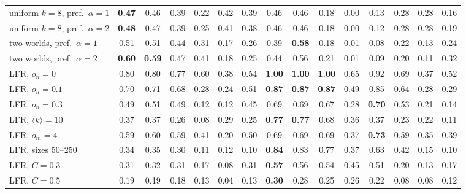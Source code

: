 \begin{table}[t]
\begin{ruledtabular}
\begin{tabular}{lcccccccccccccc}
\hline
uniform $k{=}8$, pref.\ $\alpha{=}1$ & \textbf{0.47} & 0.46 & 0.39 & 0.22 & 0.42 & 0.39 & 0.46 & 0.46 & 0.18 & 0.00 & 0.13 & 0.28 & 0.28 & 0.16 \\
uniform $k{=}8$, pref.\ $\alpha{=}2$ & \textbf{0.48} & 0.47 & 0.39 & 0.25 & 0.41 & 0.38 & 0.46 & 0.46 & 0.18 & 0.00 & 0.12 & 0.28 & 0.28 & 0.19 \\
two worlds, pref.\ $\alpha{=}1$ & 0.51 & 0.51 & 0.44 & 0.31 & 0.17 & 0.26 & 0.39 & \textbf{0.58} & 0.18 & 0.01 & 0.08 & 0.22 & 0.13 & 0.24 \\
two worlds, pref.\ $\alpha{=}2$ & \textbf{0.60} & \textbf{0.59} & 0.47 & 0.41 & 0.18 & 0.25 & 0.44 & 0.56 & 0.21 & 0.01 & 0.09 & 0.20 & 0.11 & 0.32 \\
\hline
LFR, $o_n{=}0$ & 0.80 & 0.80 & 0.77 & 0.60 & 0.38 & 0.54 & \textbf{1.00} & \textbf{1.00} & \textbf{1.00} & 0.65 & 0.92 & 0.69 & 0.37 & 0.52 \\
LFR, $o_n{=}0.1$ & 0.70 & 0.71 & 0.68 & 0.28 & 0.24 & 0.51 & \textbf{0.87} & \textbf{0.87} & \textbf{0.87} & 0.49 & 0.85 & 0.64 & 0.28 & 0.29 \\
LFR, $o_n{=}0.3$ & 0.49 & 0.51 & 0.49 & 0.12 & 0.12 & 0.45 & 0.69 & 0.69 & 0.67 & 0.28 & \textbf{0.70} & 0.53 & 0.21 & 0.14 \\
LFR, $\langle k\rangle{=}10$ & 0.37 & 0.37 & 0.26 & 0.08 & 0.29 & 0.25 & \textbf{0.77} & \textbf{0.77} & 0.68 & 0.36 & 0.37 & 0.23 & 0.22 & 0.11 \\
LFR, $o_m{=}4$ & 0.59 & 0.60 & 0.59 & 0.41 & 0.20 & 0.50 & 0.69 & 0.69 & 0.69 & 0.37 & \textbf{0.73} & 0.59 & 0.35 & 0.39 \\
LFR, sizes 50--250 & 0.34 & 0.35 & 0.30 & 0.11 & 0.12 & 0.10 & \textbf{0.84} & 0.83 & 0.77 & 0.37 & 0.63 & 0.42 & 0.15 & 0.10 \\
LFR, $C{=}0.3$ & 0.31 & 0.32 & 0.31 & 0.17 & 0.08 & 0.31 & \textbf{0.57} & 0.56 & 0.54 & 0.45 & 0.51 & 0.20 & 0.13 & 0.17 \\
LFR, $C{=}0.5$ & 0.19 & 0.19 & 0.18 & 0.13 & 0.04 & 0.13 & \textbf{0.30} & 0.28 & 0.25 & 0.26 & 0.22 & 0.08 & 0.08 & 0.12 \\
\end{tabular}
\end{ruledtabular}
\end{table}
